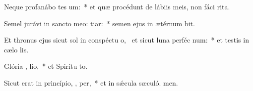 \item Neque profanábo tes um:~* et quæ procédunt de lábiis meis, non fáci rita.
\item Semel jurávi in sancto meo:   tiar:~* semen ejus in ætérnum bit.
\item Et thronus ejus sicut sol in conspéctu o,~\pscross{} et sicut luna perféc  num:~* et testis in cælo lis.
\item Glória ,  lio,~* et Spirítu to.
\item Sicut erat in princípio,  ,  per,~* et in sǽcula sæculó. men.

